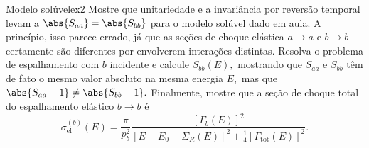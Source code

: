 \begin{exercício}{Modelo solúvel}{ex2}
   Mostre que unitariedade e a invariância por reversão temporal levam a \(\abs{S_{aa}} = \abs{S_{bb}}\) para o modelo solúvel dado em aula. A princípio, isso parece errado, já que as seções de choque elástica \(a \to a\) e \(b \to b\) certamente são diferentes por envolverem interações distintas. Resolva o problema de espalhamento com \(b\) incidente e calcule \(S_{bb}(E),\) mostrando que \(S_{aa}\) e \(S_{bb}\) têm de fato o mesmo valor absoluto na mesma energia \(E,\) mas que \(\abs{S_{aa} - 1} \neq \abs{S_{bb} - 1}.\) Finalmente, mostre que a seção de choque total do espalhamento elástico \(b \to b\) é
   \begin{equation*}
      \sigma_{\mathrm{el}}^{(b)}(E) = \frac{\pi}{p_b^2} \frac{\left[\Gamma_b(E)\right]^2}{\left[E - E_0 - \Sigma_R(E)\right]^2 + \frac14 \left[\Gamma_{\mathrm{tot}}(E)\right]^2}.
   \end{equation*}
\end{exercício}
